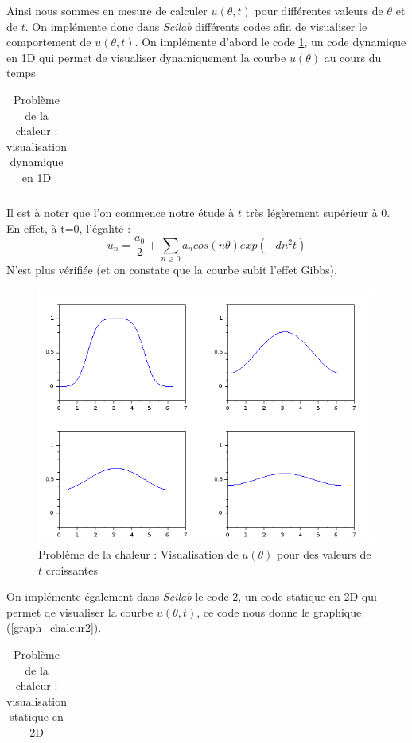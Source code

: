 \documentclass[a4paper,10pt]{report}
\begin{document}
\indent Ainsi nous sommes en mesure de calculer $u(\theta,t)$ pour différentes valeurs de $\theta$ et de $t$. On implémente donc dans \textit{Scilab} différents codes afin de visualiser le comportement de $u(\theta,t)$. On implémente d'abord le code \ref{chaleur1}, un code dynamique en 1D qui permet de visualiser dynamiquement la courbe $u(\theta)$ au cours du temps.

\begin{table}[H]
\caption{Problème de la chaleur : visualisation dynamique en 1D}
\begin{tabular}{l}

\label{chaleur1}
\end{tabular}
\end{table}

Il est à noter que l'on commence notre étude à $t$ très légèrement supérieur à 0. En effet, à t=0, l'égalité :
\abovedisplayskip=0mm
\begin{displaymath}
u_n = \frac{a_0}{2} + \sum \limits_{n\geq0}a_n cos(n \theta) exp(-dn^2t)
\end{displaymath}
N'est plus vérifiée (et on constate que la courbe subit l'effet Gibbs). \\

\begin{figure}[H]
\centering
\caption{Problème de la chaleur : Visualisation de $u(\theta)$ pour des valeurs de $t$ croissantes}
\includegraphics[width=13cm]{chaleur1.png}
\end{figure}


On implémente également dans \textit{Scilab} le code \ref{chaleur2}, un code statique en 2D qui permet de visualiser la courbe $u(\theta,t)$, ce code nous donne le graphique (\ref{graph_chaleur2}).
\begin{table}[H]
\caption{Problème de la chaleur : visualisation statique en 2D}
\begin{tabular}{l}

\label{chaleur2}
\end{tabular}
\end{table}
\end{document}
